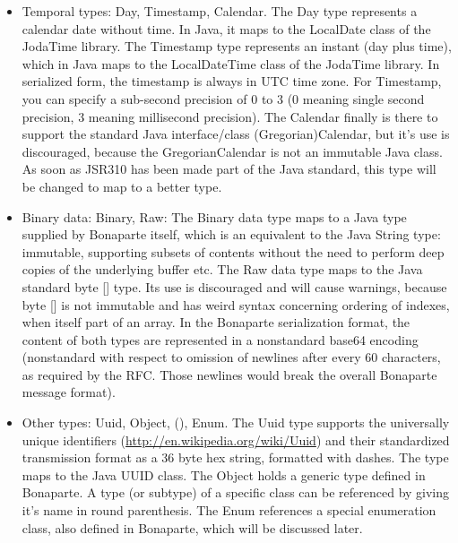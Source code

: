 \documentclass[11pt,a4paper,oneside]{article}
\begin{document}
\begin{itemize}
  \item Temporal types: {\ttfamily Day}, {\ttfamily Timestamp}, {\ttfamily Calendar}. The {\ttfamily Day} type represents a calendar date without time. In Java,
    it maps to the {\ttfamily LocalDate} class of the JodaTime library. The {\ttfamily Timestamp} type represents an instant (day plus time), which in Java maps   
    to the {\ttfamily LocalDateTime} class of the JodaTime library. In serialized form, the timestamp is always in UTC time zone. For {\ttfamily Timestamp},
    you can specify a sub-second precision of 0 to 3 (0 meaning single second precision, 3 meaning millisecond precision). 
    The {\ttfamily Calendar} finally is there to support the standard Java interface/class
    (Gregorian)Calendar, but it's use is discouraged, because the {\ttfamily GregorianCalendar} is not an immutable Java class. As soon as JSR310 has been made
    part of the Java standard, this type will be changed to map to a better type.
  \item Binary data: {\ttfamily Binary}, {\ttfamily Raw}: The {\ttfamily Binary} data type maps to a Java type supplied by Bonaparte itself, which is an
    equivalent to the Java {\ttfamily String} type: immutable, supporting subsets of contents without the need to perform deep copies of the underlying buffer etc.
    The {\ttfamily Raw} data type maps to the Java standard {\ttfamily byte []} type. Its use is discouraged and will cause warnings, because
    {\ttfamily byte []} is not immutable and has weird syntax concerning ordering of indexes, when itself part of an array.
    In the Bonaparte serialization format, the content of both types are represented in a nonstandard base64 encoding (nonstandard with respect to omission of
    newlines after every 60 characters, as required by the RFC. Those newlines would break the overall Bonaparte message format).
  \item Other types: {\ttfamily Uuid}, {\ttfamily Object}, {\ttfamily ()}, {\ttfamily Enum}. The {\ttfamily Uuid} type supports the universally unique identifiers
   (\url{http://en.wikipedia.org/wiki/Uuid}) and their standardized transmission format as a 36 byte hex string, formatted with dashes.
   The type maps to the Java UUID class. The {\ttfamily Object} holds a generic type defined in Bonaparte. A type (or subtype) of a specific class can be
    referenced by giving it's name in round parenthesis.  
   The {\ttfamily Enum} references a special enumeration class, also defined in Bonaparte, which will be discussed later.  
\end{itemize}
\end{document}
